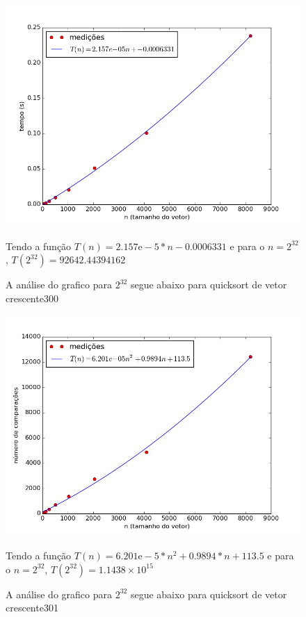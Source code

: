 \documentclass[12pt,a4paper,twoside]{report}
\begin{document}
\clearpage


\begin{figure}[ht]
\centering \includegraphics[scale=0.8]{../quicksort/imagens/quicksortQuaseCresc300.png}
\caption{A análise do grafico para $2^{32}$ segue abaixo para quicksort de vetor crescente300}
Tendo a função $T(n) = 2.157\mathrm{e}-5*n-0.0006331$ e para o $n =2^{32}$, $T(2^{32}) = 92642.44394162$ 
\label{fig:quicksortQuaseCresc300}
\end{figure}

\begin{figure}[ht]
\centering \includegraphics[scale=0.8]{../quicksort/imagens/quicksortQuaseCresc301.png}
\caption{A análise do grafico para $2^{32}$ segue abaixo para quicksort de vetor crescente301}

Tendo a função $T(n) = 6.201\mathrm{e}-5*n^2 + 0.9894*n+113.5$ e para o $n =2^{32}$, $T(2^{32}) = 1.1438 × 10^{15}$ 

\label{fig:quicksortQuaseCresc301}
\end{figure}
\end{document}
